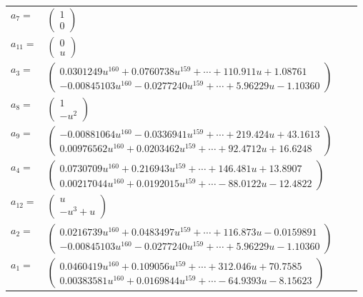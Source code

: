 \documentclass[1p]{elsarticle_modified}
\theoremstyle{definition}
\begin{document}
\begin{tabular}{m{7pt} m{180pt} m{7pt} m{180pt} }
\flushright $a_{7}=$&$\begin{pmatrix}1\\0\end{pmatrix}$ \\
\flushright $a_{11}=$&$\begin{pmatrix}0\\u\end{pmatrix}$ \\
\flushright $a_{3}=$&$\begin{pmatrix}0.0301249 u^{160}+0.0760738 u^{159}+\cdots+110.911 u+1.08761\\-0.00845103 u^{160}-0.0277240 u^{159}+\cdots+5.96229 u-1.10360\end{pmatrix}$ \\
\flushright $a_{8}=$&$\begin{pmatrix}1\\- u^2\end{pmatrix}$ \\
\flushright $a_{9}=$&$\begin{pmatrix}-0.00881064 u^{160}-0.0336941 u^{159}+\cdots+219.424 u+43.1613\\0.00976562 u^{160}+0.0203462 u^{159}+\cdots+92.4712 u+16.6248\end{pmatrix}$ \\
\flushright $a_{4}=$&$\begin{pmatrix}0.0730709 u^{160}+0.216943 u^{159}+\cdots+146.481 u+13.8907\\0.00217044 u^{160}+0.0192015 u^{159}+\cdots-88.0122 u-12.4822\end{pmatrix}$ \\
\flushright $a_{12}=$&$\begin{pmatrix}u\\- u^3+u\end{pmatrix}$ \\
\flushright $a_{2}=$&$\begin{pmatrix}0.0216739 u^{160}+0.0483497 u^{159}+\cdots+116.873 u-0.0159891\\-0.00845103 u^{160}-0.0277240 u^{159}+\cdots+5.96229 u-1.10360\end{pmatrix}$ \\
\flushright $a_{1}=$&$\begin{pmatrix}0.0460419 u^{160}+0.109056 u^{159}+\cdots+312.046 u+70.7585\\0.00383581 u^{160}+0.0169844 u^{159}+\cdots-64.9393 u-8.15623\end{pmatrix}$ \\

\end{tabular}
\end{document}
